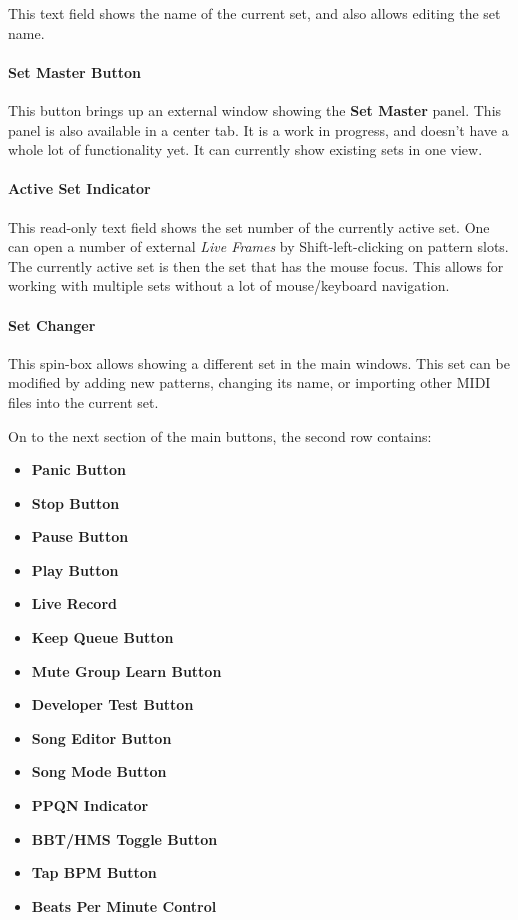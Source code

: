 \documentclass[
 11pt,
 twoside,
 a4paper,
 headinclude,
 footinclude,
 final                                 %
]{article}
\begin{document}
   This text field shows the name of the current set, and also allows editing
   the set name.

\paragraph{Set Master Button}
\label{paragraph:introduction_set_master_button}

   This button brings up an external window showing the \textbf{Set Master}
   panel.  This panel is also available in a center tab.  It is a work in
   progress, and doesn't have a whole lot of functionality yet.
   It can currently show existing sets in one view.

\paragraph{Active Set Indicator}
\label{paragraph:introduction_active_set_indicator}

   This read-only text field shows the set number of the currently active set.
   One can open a number of external \textsl{Live Frames} by
   Shift-left-clicking on pattern slots.  The currently active set is then the
   set that has the mouse focus.  This allows for working with multiple sets
   without a lot of mouse/keyboard navigation.

\paragraph{Set Changer}
\label{paragraph:introduction_set_changer}

   This spin-box allows showing a different set in the main windows.
   This set can be modified by adding new patterns, changing its name, or
   importing other MIDI files into the current set.

   On to the next section of the main buttons, the second row contains:

   \begin{itemize}
      \item \textbf{Panic Button}
      \item \textbf{Stop Button}
      \item \textbf{Pause Button}
      \item \textbf{Play Button}
      \item \textbf{Live Record}
      \item \textbf{Keep Queue Button}
      \item \textbf{Mute Group Learn Button}
      \item \textbf{Developer Test Button}
      \item \textbf{Song Editor Button}
      \item \textbf{Song Mode Button}
      \item \textbf{PPQN Indicator}
      \item \textbf{BBT/HMS Toggle Button}
      \item \textbf{Tap BPM Button}
      \item \textbf{Beats Per Minute Control}
   \end{itemize}
\end{document}
